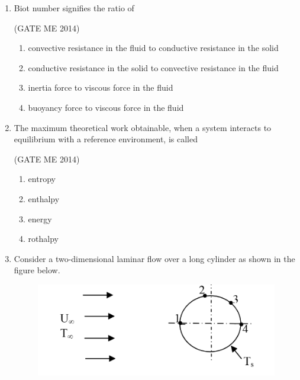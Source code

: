 \documentclass[journal]{IEEEtran}
\numberwithin{equation}{enumi}
\numberwithin{figure}{enumi}
\begin{document}
\begin{enumerate}
 \hfill{(GATE ME 2014)}
 
\begin{multicols}{4}
    \begin{enumerate}
        \item 2.14
        \item 1.89
        \item 1.21
        \item 0.96
    \end{enumerate}
\end{multicols}
\item Biot number signifies the ratio of

 \hfill{(GATE ME 2014)}
 
\begin{enumerate}
    \item convective resistance in the fluid to conductive resistance in the solid
\item  conductive resistance in the solid to convective resistance in the fluid
\item  inertia force to viscous force in the fluid
\item  buoyancy force to viscous force in the fluid
\end{enumerate}
\item The maximum theoretical work obtainable, when a system interacts to equilibrium with a reference
environment, is called

 \hfill{(GATE ME 2014)}
 
\begin{multicols}{4}
\begin{enumerate}
    \item entropy
    \item enthalpy
    \item energy
    \item rothalpy
    \end{enumerate}
    \end{multicols}
    \item Consider a two-dimensional laminar flow over a long cylinder as shown in the figure below.
\begin{figure}[H]
    \centering
    \includegraphics[width = 0.6\columnwidth]{figs/fig2.3.png}
    \caption*{}
    \label{fig:Q14}
\end{figure}


\end{enumerate}
\end{document}
